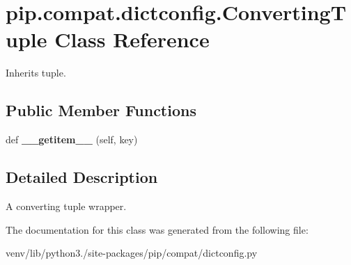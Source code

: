 \hypertarget{classpip_1_1compat_1_1dictconfig_1_1_converting_tuple}{}\section{pip.\+compat.\+dictconfig.\+Converting\+Tuple Class Reference}
\label{classpip_1_1compat_1_1dictconfig_1_1_converting_tuple}


Inherits tuple.

\subsection*{Public Member Functions}
\begin{DoxyCompactItemize}
\item 
\mbox{\label{classpip_1_1compat_1_1dictconfig_1_1_converting_tuple_a2a9d741616fe1fb68db3df8fe758c914}} 
def {\bfseries \+\_\+\+\_\+getitem\+\_\+\+\_\+} (self, key)
\end{DoxyCompactItemize}


\subsection{Detailed Description}
\begin{DoxyVerb}A converting tuple wrapper.\end{DoxyVerb}
 

The documentation for this class was generated from the following file\+:\begin{DoxyCompactItemize}
\item 
venv/lib/python3./site-\/packages/pip/compat/dictconfig.\+py\end{DoxyCompactItemize}
